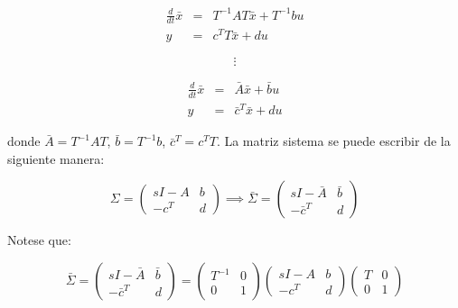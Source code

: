 \begin{enumerate}[i)]
\begin{enumerate}[a)]
                \begin{eqnarray}
                \frac{d}{dt} \bar{x} & = & T^{-1} A T \bar{x} + T^{-1} b u \nonumber \\
                y & = & c^T T \bar{x} + d u \nonumber
                \end{eqnarray}

                \begin{equation}
                    \vdots \nonumber
                \end{equation}

                \begin{eqnarray}
                \frac{d}{dt} \bar{x} & = & \bar{A} \bar{x} + \bar{b} u \nonumber \\
                y & = & \bar{c}^T \bar{x} + d u
                \end{eqnarray}

                donde $\bar{A} = T^{-1} A T$, $\bar{b} = T^{-1} b$, $\bar{c}^T = c^T T$. La matriz sistema se puede escribir de la siguiente manera:

                \begin{equation}
                    \Sigma =
                    \begin{pmatrix}
                    sI - A & b \\
                    -c^T & d
                    \end{pmatrix}
                    \implies
                    \bar{\Sigma} =
                    \begin{pmatrix}
                    sI - \bar{A} & \bar{b} \\
                    -\bar{c}^T & d
                    \end{pmatrix}
                \end{equation}

                Notese que:

                \begin{equation}
                    \bar{\Sigma} =
                    \begin{pmatrix}
                    sI - \bar{A} & \bar{b} \\
                    -\bar{c}^T & d
                    \end{pmatrix} =
                    \begin{pmatrix}
                    T^{-1} & 0 \\
                    0 & 1
                    \end{pmatrix}
                    \begin{pmatrix}
                    sI - A & b \\
                    -c^T & d
                    \end{pmatrix}
                    \begin{pmatrix}
                    T & 0 \\
                    0 & 1
                    \end{pmatrix} \nonumber
                \end{equation}


\end{enumerate}
\end{enumerate}
